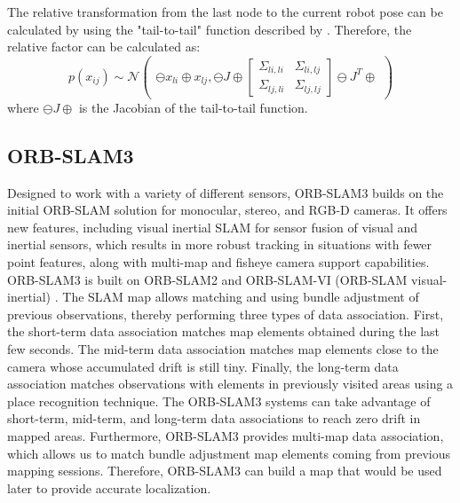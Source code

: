 \documentclass[letterpaper, 10 pt, conference]{ieeeconf}  %
\begin{document}
The relative transformation from the last node to the current robot pose can be calculated by using the "tail-to-tail" function described by \cite{tail-to-tail}. Therefore, the relative factor can be calculated as:
\begin{equation}
    p(x_{ij})\sim\mathcal{N}\begin{pmatrix}\ominus{x_{li}}\oplus{x_{lj}},
    \ominus{J}\oplus
    \begin{bmatrix} \Sigma_{li,li} & \Sigma_{li,lj}\\\Sigma_{lj, li} & \Sigma_{lj,lj}\end{bmatrix}
    \ominus{J^T}\oplus
    \end{pmatrix}
\end{equation}
where $\ominus{J}\oplus$ is the Jacobian of the tail-to-tail function.

\subsection{ORB-SLAM3}
Designed to work with a variety of different sensors, ORB-SLAM3 builds on the initial ORB-SLAM solution for monocular, stereo, and RGB-D cameras. It offers new features, including visual inertial SLAM for sensor fusion of visual and inertial sensors, which results in more robust tracking in situations with fewer point features, along with multi-map and fisheye camera support capabilities. ORB-SLAM3 is built on ORB-SLAM2 \cite{orbslam2} and ORB-SLAM-VI (ORB-SLAM visual-inertial) \cite{orbslamVI}. The SLAM map allows matching and using bundle adjustment of previous observations, thereby performing three types of data association. First, the short-term data association matches map elements obtained during the last few seconds. The mid-term data association matches map elements close to the camera whose accumulated drift is still tiny. Finally, the long-term data association matches observations with elements in previously visited areas using a place recognition technique. The ORB-SLAM3 systems can take advantage of short-term, mid-term, and long-term data associations to reach zero drift in mapped areas. Furthermore, ORB-SLAM3 provides multi-map data association, which allows us to match bundle adjustment map elements coming from previous mapping sessions. Therefore, ORB-SLAM3 can build a map that would be used later to provide accurate localization.
\end{document}
